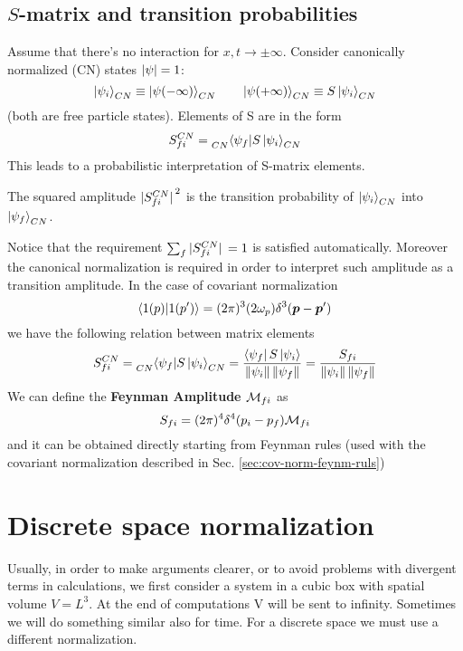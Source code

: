 \documentclass[TheoreticalPhy_ModB.tex]{subfiles}
\begin{document}
\subsection{$S$-matrix and transition probabilities}
Assume that there's no interaction for $x, t \to \pm\infty$.
Consider canonically normalized (CN) states $\abs{\psi} = 1$:
\[
\ket{\psi_i}_{CN} \equiv \ket{\psi(-\infty)}_{CN}
\qquad
\ket{\psi(+\infty)}_{CN} \equiv S \ket{\psi_i}_{CN}
\]
(both are free particle states).
Elements of S are in the form
\[
S_{fi}^{CN} = \prescript{}{CN}{\bra{\psi_f}} S \ket{ \psi_i}_{CN}
\]
This leads to a probabilistic interpretation of S-matrix elements. 
\begin{mdframed}[style=mybox]
The squared amplitude $\abs*{S_{fi}^{CN}}^2$ is the transition probability of $\ket{\psi_i}_{CN}$ into $\ket{\psi_f}_{CN}$. 
\end{mdframed}
Notice that the requirement $\sum_f \abs*{S_{fi}^{CN}} = 1$ is satisfied automatically. Moreover the canonical normalization is required in order to interpret such amplitude as a transition amplitude.
In the case of covariant normalization
\[
\braket{1(p)}{1(p')} = (2 \pi)^3 (2 \omega _p)\delta^3 (\boldsymbol{p} - \boldsymbol{p}')
\]
we have the following relation between matrix elements
\[
S_{fi}^{CN} = \prescript{}{CN}{\bra{\psi_f}} S \ket{\psi_i}_{CN} = \frac{\bra{\psi_f} S \ket{ \psi_i}}{\left\lVert \psi_i \right\rVert \left\lVert \psi_f \right\rVert} = \frac{S_{fi}}{\left\lVert \psi_i \right\rVert \left\lVert \psi_f \right\rVert}
\]
We can define the \textbf{Feynman Amplitude $\mathcal{M}_{fi}$} as
\[
S_{fi} = (2 \pi)^4 \delta^4 (p_i - p_f) \mathcal{M}_{fi}
\]
and it can be obtained directly starting from Feynman rules (used with the covariant normalization described in Sec. \ref{sec:cov-norm-feynm-ruls})

\section{Discrete space normalization}

Usually, in order to make arguments clearer, or to avoid problems with divergent terms in calculations, we first consider a system in a cubic box with spatial volume $V = L^3$.
At the end of computations V will be sent to infinity. Sometimes we will do something similar also for time.
For a discrete space we must use a different normalization.
\end{document}
